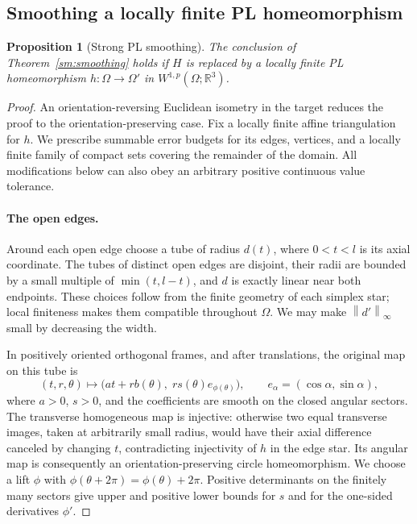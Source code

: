 \documentclass[11pt]{article}
\numberwithin{equation}{section}
\newtheorem{proposition}[theorem]{Proposition}
\theoremstyle{definition}
\theoremstyle{remark}
\newcommand{\R}{\mathbb R}
\newcommand{\norm}[1]{\left\lVert #1\right\rVert}
\begin{document}
\subsection{Smoothing a locally finite PL homeomorphism}

\begin{proposition}[Strong PL smoothing]
\label{sm:pl-smoothing}
The conclusion of Theorem~\ref{sm:smoothing} holds if $H$ is replaced
by a locally finite PL homeomorphism
$h:\Omega\to\Omega'$ in $W^{1,p}(\Omega;\R^3)$.
\end{proposition}

\begin{proof}
An orientation-reversing Euclidean isometry in the target reduces
the proof to the orientation-preserving case.  Fix a locally finite
affine triangulation for $h$.  We prescribe summable error budgets
for its edges, vertices, and a locally finite family of compact sets
covering the remainder of the domain.  All modifications below can
also obey an arbitrary positive continuous value tolerance.

\paragraph{The open edges.}
Around each open edge choose a tube of radius $d(t)$, where
$0<t<l$ is its axial coordinate.  The tubes of distinct open edges
are disjoint, their radii are bounded by a small multiple of
$\min(t,l-t)$, and $d$ is exactly linear near both endpoints.
These choices follow from the finite geometry of each simplex star;
local finiteness makes them compatible throughout $\Omega$.
We may make $\norm{d'}_\infty$ small by decreasing the width.

In positively oriented orthogonal frames, and after translations,
the original map on this tube is
\begin{equation}
 \label{sm:edge-form}
 (t,r,\theta)\longmapsto
 \bigl(at+r b(\theta),\;r s(\theta)e_{\phi(\theta)}\bigr),
 \qquad e_\alpha=(\cos\alpha,\sin\alpha),
\end{equation}
where $a>0$, $s>0$, and the coefficients are smooth on the closed
angular sectors.  The transverse homogeneous map is injective:
otherwise two equal transverse images, taken at arbitrarily small
radius, would have their axial difference canceled by changing $t$,
contradicting injectivity of $h$ in the edge star.  Its angular
map is consequently an orientation-preserving circle
homeomorphism.  We choose a lift $\phi$ with
$\phi(\theta+2\pi)=\phi(\theta)+2\pi$.
Positive determinants on the finitely many sectors give upper and
positive lower bounds for $s$ and for the one-sided derivatives
$\phi'$.


\end{proof}
\end{document}

